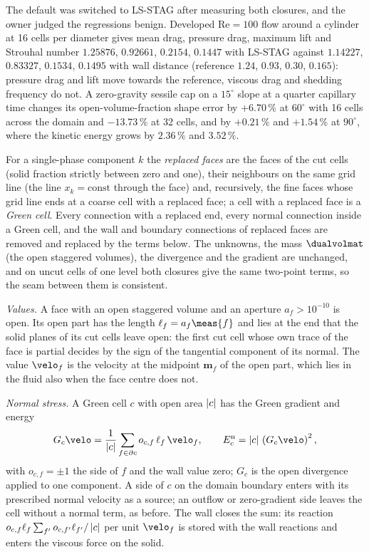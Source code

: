 The default was switched to LS-STAG after measuring both closures, and the
owner judged the regressions benign. Developed $\mathrm{Re}=100$ flow around a
cylinder at 16 cells per diameter gives mean drag, pressure drag, maximum lift
and Strouhal number $1.25876$, $0.92661$, $0.2154$, $0.1447$ with LS-STAG
against $1.14227$, $0.83327$, $0.1534$, $0.1495$ with wall distance
(reference $1.24$, $0.93$, $0.30$, $0.165$): pressure drag and lift move
towards the reference, viscous drag and shedding frequency do not. A
zero-gravity sessile cap on a $15^\circ$ slope at a quarter capillary time
changes its open-volume-fraction shape error by $+6.70\,\%$ at $60^\circ$ with
16 cells across the domain and $-13.73\,\%$ at 32 cells, and by $+0.21\,\%$
and $+1.54\,\%$ at $90^\circ$, where the kinetic energy grows by $2.36\,\%$
and $3.52\,\%$.

For a single-phase component $k$ the \emph{replaced faces} are the faces of the cut cells (solid fraction
strictly between zero and one), their neighbours on the same grid line (the
line $x_k=\text{const}$ through the face) and, recursively, the fine faces
whose grid line ends at a coarse cell with a replaced face; a cell with a
replaced face is a \emph{Green cell}. Every connection with a replaced end,
every normal connection inside a Green cell, and the wall and boundary
connections of replaced faces are removed and replaced by the terms below.
The unknowns, the mass $\dualvolmat$ (the open staggered volumes), the
divergence and the gradient are unchanged, and on uncut cells of one level
both closures give the same two-point terms, so the seam between them is
consistent.

\emph{Values.} A face with an open staggered volume and an aperture
$a_f>10^{-10}$ is open. Its open part has the length $\ell_f=a_f\meas{f}$ and
lies at the end that the solid planes of its cut cells leave open: the first
cut cell whose own trace of the face is partial decides by the sign of the
tangential component of its normal. The value $\velo_f$ is the velocity at
the midpoint $\mathbf m_f$ of the open part, which lies in the fluid also
when the face centre does not.

\emph{Normal stress.} A Green cell $c$ with open area $\left\lvert c \right\rvert$ has the Green
gradient and energy
\begin{equation}\label{eq:viscosity:lsstag}
  G_c\velo=\frac{1}{\abs{c}}\sum_{f\in\partial c}o_{c,f}\,\ell_f\,\velo_f ,
  \qquad
  E^{\mathrm n}_c=\abs{c}\,\roundpar{G_c\velo}^2 ,
\end{equation}
with $o_{c,f}=\pm1$ the side of $f$ and the wall value zero; $G_c$ is the
open divergence applied to one component. A side of $c$ on the domain
boundary enters with its prescribed normal velocity as a source; an outflow or
zero-gradient side leaves the cell without a normal term, as before. The wall
closes the sum: its reaction $o_{c,f}\ell_f\sum_{f'}o_{c,f'}\ell_{f'}/\left\lvert c \right\rvert$
per unit $\velo_f$ is stored with the wall reactions and enters the viscous
force on the solid.

